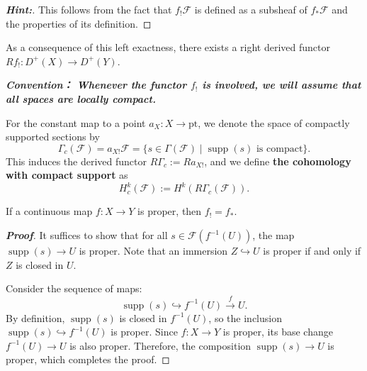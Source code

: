\begin{proof}[\textbf{Hint:}]
This follows from the fact that $f_!\mathcal{F}$ is defined as a subsheaf of $f_*\mathcal{F}$ and the properties of its definition.
\end{proof}

As a consequence of this left exactness, there exists a right derived functor $Rf_! \colon D^+(X) \to D^+(Y)$.

\textit{
\textbf{Convention： Whenever the functor $f_!$ is involved, we will assume that all spaces are locally compact.
}}

For the constant map to a point $a_X \colon X \to \text{pt}$, we denote the space of compactly supported sections by
\begin{equation*}
    \Gamma_c(\mathcal{F}) = a_{X!}\mathcal{F} = \{ s \in \Gamma(\mathcal{F}) \mid \operatorname{supp}(s) \text{ is compact} \}.
\end{equation*}
This induces the derived functor $R\Gamma_c := Ra_{X!}$, and we define \textbf{the cohomology with compact support} as
\begin{equation}\label{cohomology_compact_support}
    H^k_c(\mathcal{F}) := H^k(R\Gamma_c(\mathcal{F})).
\end{equation}

\begin{example}
If a continuous map $f \colon X \to Y$ is proper, then $f_! = f_*$.
\end{example}

\begin{proof}[\textbf{Proof}]
It suffices to show that for all $s \in \mathcal{F}(f^{-1}(U))$, the map $\operatorname{supp}(s) \to U$ is proper. 
Note that an immersion $Z \hookrightarrow U$ is proper if and only if $Z$ is closed in $U$.

Consider the sequence of maps:
\begin{equation*}
    \operatorname{supp}(s) \hookrightarrow f^{-1}(U) \xrightarrow{f} U.
\end{equation*}
By definition, $\operatorname{supp}(s)$ is closed in $f^{-1}(U)$, so the inclusion $\operatorname{supp}(s) \hookrightarrow f^{-1}(U)$ is proper. Since $f \colon X \to Y$ is proper, its base change $f^{-1}(U) \to U$ is also proper. Therefore, the composition $\operatorname{supp}(s) \to U$ is proper, which completes the proof.
\end{proof}


